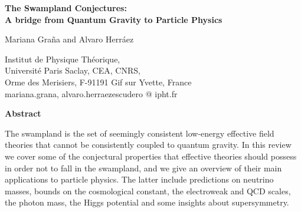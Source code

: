 \documentclass[11pt,a4paper]{article}
\begin{document}

\begin{flushright}
%
%
\end{flushright}
\pagestyle{empty}
\vspace{20mm}

\begin{adjustwidth}{-15mm}{-15mm} %
 \begin{center}
{\LARGE \textbf{{The Swampland Conjectures: \\
{\vskip 0.2cm}
A bridge from Quantum Gravity to Particle Physics}}}

\vspace{10mm} {\Large Mariana Gra\~na and Alvaro Herr\'aez}\\

\vspace{5mm}

Institut de Physique Th\'eorique, \\
Universit\'e Paris Saclay, CEA, CNRS, \\
Orme des Merisiers,  F-91191 Gif sur Yvette, France \\

\vspace{.5mm} {\small\upshape\ttfamily mariana.grana, alvaro.herraezescudero @ ipht.fr} \\

\vspace{15mm}



\textbf{Abstract}
\end{center}
\end{adjustwidth}

\vspace{3mm}

\begin{adjustwidth}{6.5mm}{6.5mm} %
The swampland is the set of seemingly consistent low-energy effective field theories that cannot be consistently coupled to quantum gravity. In this review we cover some of the conjectural properties that effective theories should possess in order not to fall in the swampland, and we give an overview of their main applications to particle physics. The latter include predictions on neutrino masses, bounds on the cosmological constant, the electroweak and QCD scales, the photon mass, the Higgs potential and some insights about supersymmetry.

\end{adjustwidth}
\end{document}
